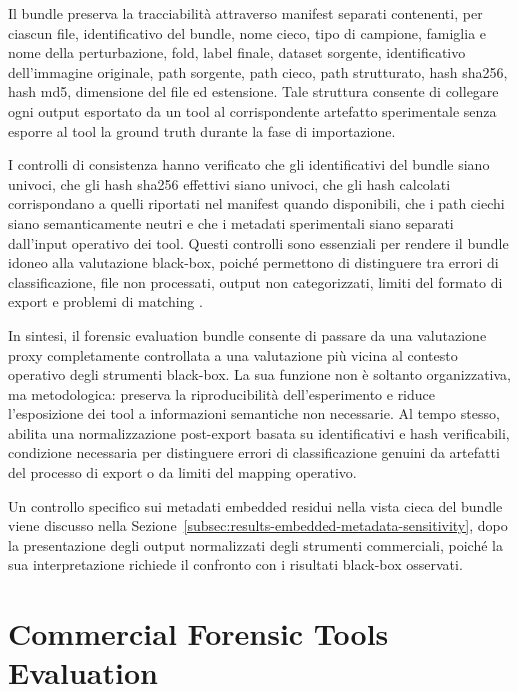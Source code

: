 Il bundle preserva la tracciabilità attraverso manifest separati contenenti, per
ciascun file, identificativo del bundle, nome cieco, tipo di campione, famiglia e
nome della perturbazione, fold, label finale, dataset sorgente, identificativo
dell'immagine originale, path sorgente, path cieco, path strutturato, hash
\gls{sha256}, hash \gls{md5}, dimensione del file ed estensione. Tale struttura
consente di collegare ogni output esportato da un tool al corrispondente
artefatto sperimentale senza esporre al tool la ground truth durante la fase di
importazione.

I controlli di consistenza hanno verificato che gli identificativi del bundle
siano univoci, che gli hash \gls{sha256} effettivi siano univoci, che gli hash
calcolati corrispondano a quelli riportati nel manifest quando disponibili, che i
path ciechi siano semanticamente neutri e che i metadati sperimentali siano
separati dall'input operativo dei tool. Questi controlli sono essenziali per
rendere il bundle idoneo alla valutazione black-box, poiché permettono di
distinguere tra errori di classificazione, file non processati, output non
categorizzati, limiti del formato di export e problemi di matching
\cite{iso27041,iso27042,iso27043,swgde2014validation}.

In sintesi, il forensic evaluation bundle consente di passare da una valutazione
proxy completamente controllata a una valutazione più vicina al contesto
operativo degli strumenti black-box. La sua funzione non è soltanto organizzativa,
ma metodologica: preserva la riproducibilità dell'esperimento e riduce
l'esposizione dei tool a informazioni semantiche non necessarie. Al tempo stesso,
abilita una normalizzazione post-export basata su identificativi e hash
verificabili, condizione necessaria per distinguere errori di classificazione
genuini da artefatti del processo di export o da limiti del mapping operativo.

Un controllo specifico sui metadati embedded residui nella vista cieca del
bundle viene discusso nella
Sezione~\ref{subsec:results-embedded-metadata-sensitivity}, dopo la presentazione
degli output normalizzati degli strumenti commerciali, poiché la sua
interpretazione richiede il confronto con i risultati black-box osservati.

\section{Commercial Forensic Tools Evaluation}
\label{sec:results-commercial}

